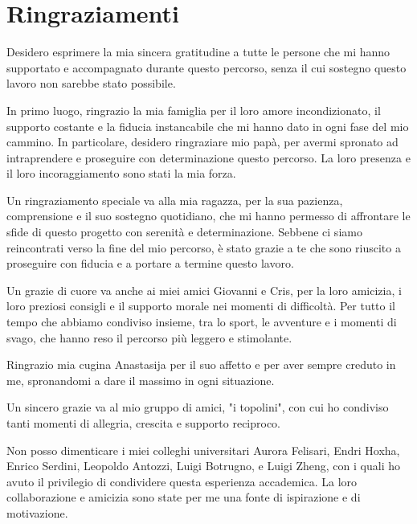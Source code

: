 \chapter*{Ringraziamenti}

Desidero esprimere la mia sincera gratitudine a tutte le persone che mi hanno supportato e accompagnato durante questo percorso, senza il cui sostegno questo lavoro non sarebbe stato possibile.\vspace{5pt}

In primo luogo, ringrazio la mia famiglia per il loro amore incondizionato, il supporto costante e la fiducia instancabile che mi hanno dato in ogni fase del mio cammino. In particolare, desidero ringraziare mio papà, per avermi spronato ad intraprendere e proseguire con determinazione questo percorso. La loro presenza e il loro incoraggiamento sono stati la mia forza.\vspace{5pt}

Un ringraziamento speciale va alla mia ragazza, per la sua pazienza, comprensione e il suo sostegno quotidiano, che mi hanno permesso di affrontare le sfide di questo progetto con serenità e determinazione. Sebbene ci siamo reincontrati verso la fine del mio percorso, è stato grazie a te che sono riuscito a proseguire con fiducia e a portare a termine questo lavoro.\vspace{5pt}

Un grazie di cuore va anche ai miei amici Giovanni e Cris, per la loro amicizia, i loro preziosi consigli e il supporto morale nei momenti di difficoltà. Per tutto il tempo che abbiamo condiviso insieme, tra lo sport, le avventure e i momenti di svago, che hanno reso il percorso più leggero e stimolante.\vspace{5pt}

Ringrazio mia cugina Anastasija per il suo affetto e per aver sempre creduto in me, spronandomi a dare il massimo in ogni situazione.\vspace{5pt}

Un sincero grazie va al mio gruppo di amici, "i topolini", con cui ho condiviso tanti momenti di allegria, crescita e supporto reciproco.\vspace{5pt}

Non posso dimenticare i miei colleghi universitari Aurora Felisari, Endri Hoxha, Enrico Serdini, Leopoldo Antozzi, Luigi Botrugno, e Luigi Zheng, con i quali ho avuto il privilegio di condividere questa esperienza accademica. La loro collaborazione e amicizia sono state per me una fonte di ispirazione e di motivazione.\vspace{5pt}

